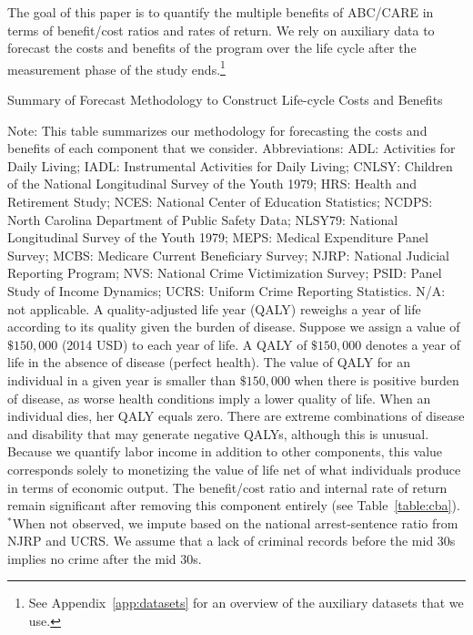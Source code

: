 The goal of this paper is to quantify the multiple benefits of ABC/CARE in terms of benefit/cost ratios and rates of return. We rely on auxiliary data to forecast the costs and benefits of the program over the life cycle after the measurement phase of the study ends.\footnote{See Appendix~\ref{app:datasets} for an overview of the auxiliary datasets that we use.}

\begin{table}
\begin{threeparttable}
\caption{Summary of Forecast Methodology to Construct Life-cycle Costs and Benefits} \label{table:sources}
\tiny

\begin{tablenotes}
\scriptsize
Note: This table summarizes our methodology for forecasting the costs and benefits of each component that we consider. Abbreviations: ADL: Activities for Daily Living; IADL: Instrumental Activities for Daily Living; CNLSY: Children of the National Longitudinal Survey of the Youth 1979;  HRS: Health and Retirement Study; NCES: National Center of Education Statistics; NCDPS: North Carolina Department of Public Safety Data; NLSY79: National Longitudinal Survey of the Youth 1979; MEPS: Medical Expenditure Panel Survey; MCBS: Medicare Current Beneficiary Survey; NJRP: National Judicial Reporting Program; NVS: National Crime Victimization Survey; PSID: Panel Study of Income Dynamics; UCRS: Uniform Crime Reporting Statistics. N/A: not applicable. A quality-adjusted life year (QALY) reweighs a year of life according to its quality given the burden of disease. Suppose we assign a value of $\$150,000$ (2014 USD) to each year of life. A QALY of $\$150,000$ denotes a year of life in the absence of disease (perfect health). The value of QALY for an individual in a given year is smaller than $\$150,000$ when there is positive burden of disease, as worse health conditions imply a lower quality of life. When an individual dies, her QALY equals zero. There are extreme combinations of disease and disability that may generate negative QALYs, although this is unusual. Because we quantify labor income in addition to other components, this value corresponds solely to monetizing the value of life net of what individuals produce in terms of economic output. The benefit/cost ratio and internal rate of return remain significant after removing this component entirely (see Table~\ref{table:cba}). \\
$^*$When not observed, we impute based on the national arrest-sentence ratio  from NJRP and UCRS. We assume that a lack of criminal records before the mid 30s implies no crime after the mid 30s. \\
\end{tablenotes}
\end{threeparttable}
\end{table}

